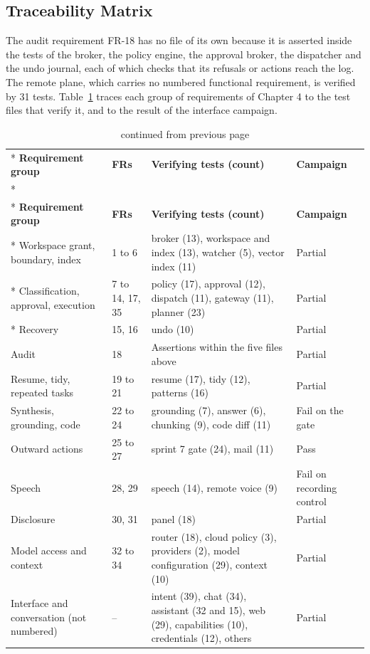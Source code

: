 \documentclass{FastFyp}
\begin{document}
\subsection{Traceability Matrix}
The audit requirement FR-18 has no file of its own because it is asserted inside the tests of the broker, the policy engine, the approval broker, the dispatcher and the undo journal, each of which checks that its refusals or actions reach the log. The remote plane, which carries no numbered functional requirement, is verified by 31 tests. Table~\ref{tab:trace} traces each group of requirements of Chapter 4 to the test files that verify it, and to the result of the interface campaign.

{
\begin{longtable}{|p{4.2cm}|p{1.6cm}|p{4.9cm}|p{2.5cm}|}
\caption{Requirements traceability.}\label{tab:trace}\\*
\hline
\textbf{Requirement group} & \textbf{FRs} & \textbf{Verifying tests (count)} & \textbf{Campaign} \\*
\hline
\endfirsthead
\caption[]{continued from previous page}\\*
\hline
\textbf{Requirement group} & \textbf{FRs} & \textbf{Verifying tests (count)} & \textbf{Campaign} \\*
\hline
\endhead
\hline
Workspace grant, boundary, index & 1 to 6 & broker (13), workspace and index (13), watcher (5), vector index (11) & Partial \\*
\hline
Classification, approval, execution & 7 to 14, 17, 35 & policy (17), approval (12), dispatch (11), gateway (11), planner (23) & Partial \\*
\hline
Recovery & 15, 16 & undo (10) & Partial \\
\hline
Audit & 18 & Assertions within the five files above & Partial \\
\hline
Resume, tidy, repeated tasks & 19 to 21 & resume (17), tidy (12), patterns (16) & Partial \\
\hline
Synthesis, grounding, code & 22 to 24 & grounding (7), answer (6), chunking (9), code diff (11) & Fail on the gate \\
\hline
Outward actions & 25 to 27 & sprint 7 gate (24), mail (11) & Pass \\
\hline
Speech & 28, 29 & speech (14), remote voice (9) & Fail on recording control \\
\hline
Disclosure & 30, 31 & panel (18) & Partial \\
\hline
Model access and context & 32 to 34 & router (18), cloud policy (3), providers (2), model configuration (29), context (10) & Partial \\
\hline
Interface and conversation (not numbered) & -- & intent (39), chat (34), assistant (32 and 15), web (29), capabilities (10), credentials (12), others & Partial \\
\hline
\end{longtable}
}
\end{document}
